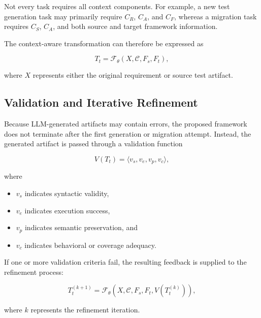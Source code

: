 \documentclass[pdflatex,sn-mathphys-num]{sn-jnl}
\begin{document}
Not every task requires all context components. For example, a new test
generation task may primarily require $C_R$, $C_A$, and $C_F$, whereas a
migration task requires $C_S$, $C_A$, and both source and target framework
information.

The context-aware transformation can therefore be expressed as

\begin{equation}
    T_t
    =
    \mathcal{F}_{\theta}
    (X,\mathcal{C},F_s,F_t),
\label{eq:context-aware}
\end{equation}

where $X$ represents either the original requirement or source test artifact.

\subsection{Validation and Iterative Refinement}

Because LLM-generated artifacts may contain errors, the proposed framework
does not terminate after the first generation or migration attempt. Instead,
the generated artifact is passed through a validation function

\begin{equation}
    V(T_t)
    =
    \langle
    v_s,v_e,v_p,v_c
    \rangle ,
\label{eq:validation}
\end{equation}

where

\begin{itemize}
    \item $v_s$ indicates syntactic validity,
    \item $v_e$ indicates execution success,
    \item $v_p$ indicates semantic preservation, and
    \item $v_c$ indicates behavioral or coverage adequacy.
\end{itemize}

If one or more validation criteria fail, the resulting feedback is supplied
to the refinement process:

\begin{equation}
    T_t^{(k+1)}
    =
    \mathcal{F}_{\theta}
    \left(
        X,
        \mathcal{C},
        F_s,
        F_t,
        V(T_t^{(k)})
    \right),
\label{eq:refinement}
\end{equation}

where $k$ represents the refinement iteration.
\end{document}
